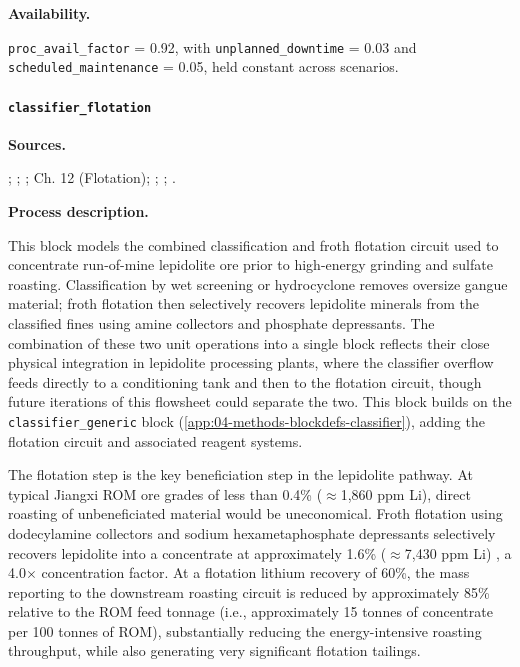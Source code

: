 \medskip
\noindent\textbf{Availability.}\quad

\texttt{proc\_avail\_factor} = 0.92, with \texttt{unplanned\_downtime} = 0.03 and \texttt{scheduled\_maintenance} = 0.05, held constant across scenarios.

\clearpage
\paragraph{\texttt{classifier\_flotation}}\label{app:04-methods-blockdefs-classifierflotation}

\medskip
\noindent\textbf{Sources.}\quad

\citet{jiaoKeyTechnologiesDevelopment2024}; \citet{garrettHandbookLithiumNatural2004}; \citet{dengSystematicReviewSulfate2026}; \citet{darlingSMEMiningEngineering2011} Ch. 12 (Flotation); \citet{ausimmMonograph27Cost}; \citet{metso:outotecBasicsMineralsProcessing2024}; \citet{petersPlantDesignEconomics1991}.

\medskip
\noindent\textbf{Process description.}\quad

This block models the combined classification and froth flotation circuit used to concentrate run-of-mine lepidolite ore prior to high-energy grinding and sulfate roasting. Classification by wet screening or hydrocyclone removes oversize gangue material; froth flotation then selectively recovers lepidolite minerals from the classified fines using amine collectors and phosphate depressants. The combination of these two unit operations into a single block reflects their close physical integration in lepidolite processing plants, where the classifier overflow feeds directly to a conditioning tank and then to the flotation circuit, though future iterations of this flowsheet could separate the two. This block builds on the \texttt{classifier\_generic} block (\ref{app:04-methods-blockdefs-classifier}), adding the flotation circuit and associated reagent systems.

The flotation step is the key beneficiation step in the lepidolite pathway. At typical Jiangxi ROM ore grades of less than 0.4\%  ($\approx$1,860 ppm Li), direct roasting of unbeneficiated material would be uneconomical. Froth flotation using dodecylamine collectors and sodium hexametaphosphate depressants selectively recovers lepidolite into a concentrate at approximately 1.6\%  ($\approx$7,430 ppm Li) \cite{jiaoKeyTechnologiesDevelopment2024, garrettHandbookLithiumNatural2004}, a 4.0$\times$ concentration factor. At a flotation lithium recovery of 60\%, the mass reporting to the downstream roasting circuit is reduced by approximately 85\% relative to the ROM feed tonnage (i.e., approximately 15 tonnes of concentrate per 100 tonnes of ROM), substantially reducing the energy-intensive roasting throughput, while also generating very significant flotation tailings.


